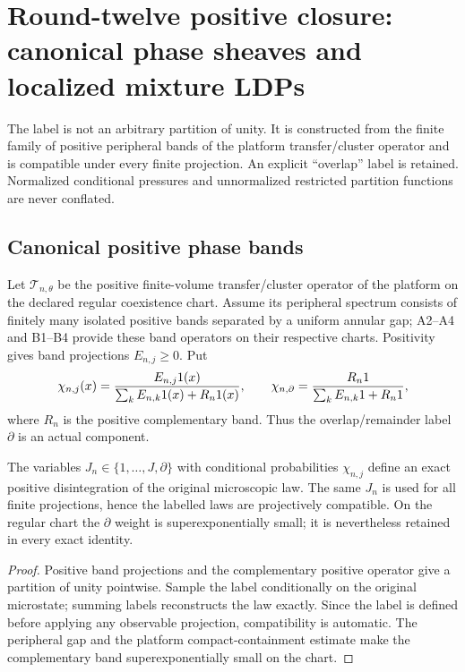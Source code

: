 \section{Round-twelve positive closure: canonical phase sheaves and localized mixture LDPs}
\label{sec:r12-d1}

The label is not an arbitrary partition of unity.  It is constructed from the
finite family of positive peripheral bands of the platform transfer/cluster
operator and is compatible under every finite projection.  An explicit
``overlap'' label is retained.  Normalized conditional pressures and
unnormalized restricted partition functions are never conflated.

\subsection{Canonical positive phase bands}

Let $\mathcal T_{n,\theta}$ be the positive finite-volume transfer/cluster
operator of the platform on the declared regular coexistence chart.  Assume
its peripheral spectrum consists of finitely many isolated positive bands
separated by a uniform annular gap; A2--A4 and B1--B4 provide these band
operators on their respective charts.  Positivity gives band projections
$E_{n,j}\ge0$.  Put
\[
 \chi_{n,j}(x)={E_{n,j}1(x)\over\sum_kE_{n,k}1(x)+R_n1(x)},
 \qquad
 \chi_{n,\partial}={R_n1\over\sum_kE_{n,k}1+R_n1},
\]
where $R_n$ is the positive complementary band.  Thus the overlap/remainder
label $\partial$ is an actual component.

\begin{theorem}
\label{thm:r12-d1-label}
The variables $J_n\in\{1,\ldots,J,\partial\}$ with conditional probabilities
$\chi_{n,j}$ define an exact positive disintegration of the original
microscopic law.  The same $J_n$ is used for all finite projections, hence the
labelled laws are projectively compatible.  On the regular chart the
$\partial$ weight is superexponentially small; it is nevertheless retained in
every exact identity.
\end{theorem}

\begin{proof}
Positive band projections and the complementary positive operator give a
partition of unity pointwise.  Sample the label conditionally on the original
microstate; summing labels reconstructs the law exactly.  Since the label is
defined before applying any observable projection, compatibility is automatic.
The peripheral gap and the platform compact-containment estimate make the
complementary band superexponentially small on the chart.
\end{proof}

